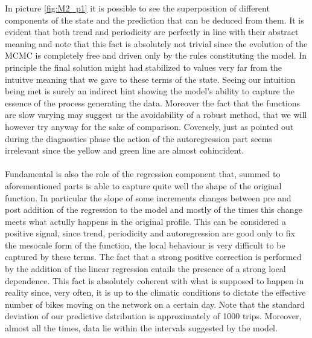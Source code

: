 \documentclass[11pt,twoside]{report}
\begin{document}
In picture \ref{fig:M2_p1} it is possible to see the superposition of different components of the state and the prediction that can be deduced from them. It is evident that both trend and periodicity are perfectly in line with their abstract meaning and note that this fact is absolutely not trivial since the evolution of the MCMC is completely free and driven only by the rules constituting the model. In principle the final solution might had stabilized to values very far from the intuitve meaning that we gave to these terms of the state. Seeing our intuition being met is surely an indirect hint showing the model's ability to capture the essence of the process generating the data. Moreover the fact that the functions are slow varying may suggest us the avoidability of a robust method, that we will however try anyway for the sake of comparison. Coversely, just as pointed out during the diagnostics phase the action of the autoregression part seems irrelevant since the yellow and green line are almost cohincident.\\
\\
Fundamental is also the role of the regression component that, summed to aforementioned parts is able to capture quite well the shape of the original function. In particular the slope of some increments changes between pre and post addition of the regression to the model and mostly of the times this change meets what actully happens in the original profile. This can be considered a positive signal, since trend, periodicity and autoregression are good only to fix the mesocale form of the function, the local behaviour is very difficult to be captured by these terms. The fact that a strong positive correction is performed by the addition of the linear regression entails the presence of a strong local dependence. This fact is absolutely coherent with what is supposed to happen in reality since, very often, it is up to the climatic conditions to dictate the effective number of bikes moving on the network on a certain day. Note that the standard deviation of our predictive dstribution is approximately of 1000 trips. Moreover, almost all the times, data lie within the intervals suggested by the model.\\
\\
\end{document}
